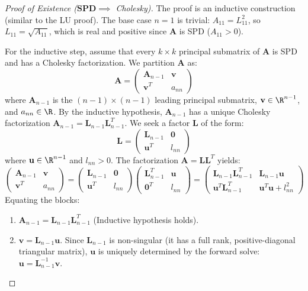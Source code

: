 \begin{proof}[Proof of Existence ($\mathbf{SPD} \implies$ Cholesky)]
The proof is an inductive construction (similar to the LU proof). The base case $n=1$ is trivial: $A_{11} = L_{11}^2$, so $L_{11} = \sqrt{A_{11}}$, which is real and positive since $\mathbf{A}$ is SPD ($A_{11} > 0$).

For the inductive step, assume that every $k \times k$ principal submatrix of $\mathbf{A}$ is SPD and has a Cholesky factorization. We partition $\mathbf{A}$ as:
\[ \mathbf{A} = \begin{pmatrix} \mathbf{A}_{n-1} & \mathbf{v} \\ \mathbf{v}^T & a_{nn} \end{pmatrix} \]
where $\mathbf{A}_{n-1}$ is the $(n-1) \times (n-1)$ leading principal submatrix, $\mathbf{v} \in \R^{n-1}$, and $a_{nn} \in \R$. By the inductive hypothesis, $\mathbf{A}_{n-1}$ has a unique Cholesky factorization $\mathbf{A}_{n-1} = \mathbf{L}_{n-1} \mathbf{L}_{n-1}^T$.
We seek a factor $\mathbf{L}$ of the form:
\[ \mathbf{L} = \begin{pmatrix} \mathbf{L}_{n-1} & \mathbf{0} \\ \mathbf{u}^T & l_{nn} \end{pmatrix} \]
where $\mathbf{u} \in \R^{n-1}$ and $l_{nn} > 0$. The factorization $\mathbf{A} = \mathbf{L}\mathbf{L}^T$ yields:
\[ \begin{pmatrix} \mathbf{A}_{n-1} & \mathbf{v} \\ \mathbf{v}^T & a_{nn} \end{pmatrix} = \begin{pmatrix} \mathbf{L}_{n-1} & \mathbf{0} \\ \mathbf{u}^T & l_{nn} \end{pmatrix} \begin{pmatrix} \mathbf{L}_{n-1}^T & \mathbf{u} \\ \mathbf{0}^T & l_{nn} \end{pmatrix} = \begin{pmatrix} \mathbf{L}_{n-1} \mathbf{L}_{n-1}^T & \mathbf{L}_{n-1} \mathbf{u} \\ \mathbf{u}^T \mathbf{L}_{n-1}^T & \mathbf{u}^T \mathbf{u} + l_{nn}^2 \end{pmatrix} \]
Equating the blocks:
\begin{enumerate}
    \item $\mathbf{A}_{n-1} = \mathbf{L}_{n-1} \mathbf{L}_{n-1}^T$ (Inductive hypothesis holds).
    \item $\mathbf{v} = \mathbf{L}_{n-1} \mathbf{u}$. Since $\mathbf{L}_{n-1}$ is non-singular (it has a full rank, positive-diagonal triangular matrix), $\mathbf{u}$ is uniquely determined by the forward solve: $\mathbf{u} = \mathbf{L}_{n-1}^{-1} \mathbf{v}$.

\end{enumerate}
\end{proof}
